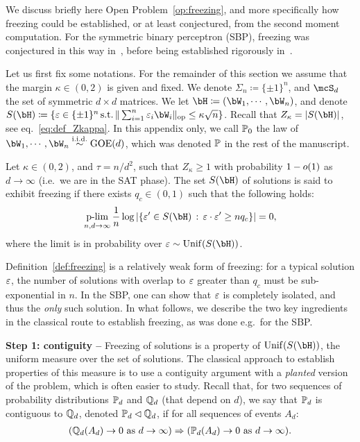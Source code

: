 We discuss briefly here Open Problem~\ref{op:freezing}, and more specifically how freezing could be established, 
or at least conjectured, from the second moment computation.
For the symmetric binary perceptron (SBP), freezing was conjectured in this way in~\cite{aubin2019storage}, before being established rigorously in~\cite{perkins2021frozen,abbe2022proof}.

\myskip 
Let us first fix some notations.
For the remainder of this section we assume that the margin $\kappa \in (0,2)$ is given and fixed.
We denote $\Sigma_n \coloneqq \{\pm 1\}^n$, and $\mcS_d$ the set of symmetric $d \times d$ matrices.
We let $\bH \coloneqq (\bW_1, \cdots, \bW_n)$, and denote $S(\bH) \coloneqq \{\eps \in \{\pm 1\}^n \, \textrm{s.t.} \, \|\sum_{i=1}^n \eps_i \bW_i\|_{\op} \leq \kappa \sqrt{n} \}$.
Recall that $Z_\kappa = |S(\bH)|$, see eq.~\eqref{eq:def_Zkappa}.
In this appendix only, we call $\mathbb{P}_0$ the law of $\bW_1, \cdots, \bW_n \iid \GOE(d)$, which was denoted $\mathbb{P}$ in the rest of the manuscript.

\begin{definition}[Freezing]\label{def:freezing}
    Let $\kappa \in (0,2)$, and $\tau = n/d^2$, such that $Z_\kappa \geq 1$ with probability $1 - o(1)$ as $d \to \infty$ (i.e.\ we are in the SAT phase).
    The set $S(\bH)$ of solutions is said to exhibit freezing
    if there exists $q_c \in (0,1)$ such that the following holds:
    \begin{align*}
        \plim_{n,d \to \infty} \frac{1}{n} \log |\{\eps' \in S(\bH) \, : \, \eps \cdot \eps' \geq n q_c\}| = 0,
    \end{align*}
    where the limit is in probability over $\eps \sim \Unif(S(\bH))$.
\end{definition}
\noindent
Definition~\ref{def:freezing} is a relatively weak form of freezing: for a typical solution $\varepsilon$, the number of solutions with overlap to $\varepsilon$ greater than $q_c$  
must be sub-exponential in $n$. In the SBP, one can show that $\varepsilon$ is completely isolated, and thus the \emph{only} such solution.
In what follows, we describe the two key ingredients in the classical route to establish freezing, as was done e.g.\ for the SBP.

\myskip 
\textbf{Step 1: contiguity --}
Freezing of solutions is a property of $\Unif(S(\bH))$, the uniform measure over the set of solutions.
The classical approach to establish properties of this measure is to use a contiguity argument with a \emph{planted} version of the problem, 
which is often easier to study.
Recall that, for two sequences of probability distributions $\mathbb{P}_d$ and $\mathbb{Q}_d$ (that depend on $d$), we say that $\mathbb{P}_d$ is contiguous to $\mathbb{Q}_d$, denoted $\mathbb{P}_d \lhd \mathbb{Q}_d$, 
if for all sequences of events $A_d$:
\begin{align}\label{eq:contiguity}
(\mathbb{Q}_d(A_d) \to 0 \textrm{ as } d \to \infty)
 \Rightarrow 
(\mathbb{P}_d(A_d) \to 0 \textrm{ as } d \to \infty).
\end{align}

